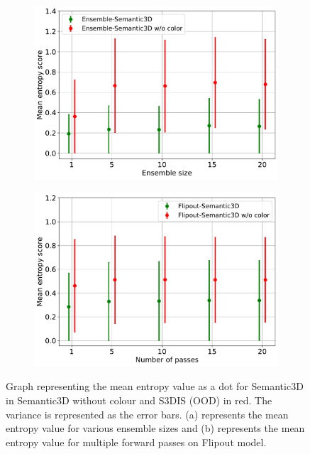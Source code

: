     \begin{figure}[!ht]
        \centering
        \begin{subfigure}{0.98\textwidth}
            \centering
        \includegraphics[scale=0.5]{images/MSP/Ensembles_ENT_semvsemwoc.pdf}
        \caption{}
        \label{fig:ent_ensembles_ood_2}
        \end{subfigure}
        \begin{subfigure}{0.98\textwidth}
            \centering
        \includegraphics[scale=0.5]{images/MSP/Flipout_ENT_semvsemwoc.pdf}
        \caption{}
        \label{fig:ent_flipout_ood_2}
        \end{subfigure}
        \caption{Graph representing the mean entropy value as a dot for Semantic3D in Semantic3D without colour and S3DIS (OOD) in red. The variance is represented as the error bars.  (a) represents the mean entropy value for various ensemble sizes and (b) represents the mean entropy value for multiple forward passes on Flipout model.}
    \end{figure}

